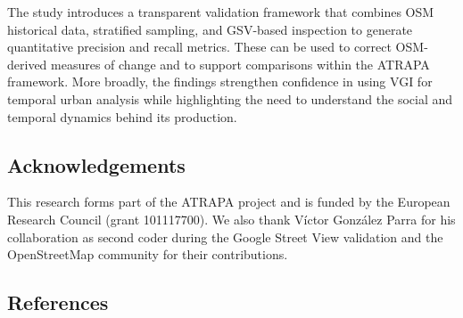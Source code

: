\documentclass[
  preprint, 3p, authoryear]{article}
\begin{document}
The study introduces a transparent validation framework that combines
OSM historical data, stratified sampling, and GSV-based inspection to
generate quantitative precision and recall metrics. These can be used to
correct OSM-derived measures of change and to support comparisons within
the ATRAPA framework. More broadly, the findings strengthen confidence
in using VGI for temporal urban analysis while highlighting the need to
understand the social and temporal dynamics behind its production.

\subsection*{Acknowledgements}\label{acknowledgements}

This research forms part of the ATRAPA project and is funded by the
European Research Council (grant 101117700). We also thank Víctor
González Parra for his collaboration as second coder during the Google
Street View validation and the OpenStreetMap community for their
contributions.

\subsection*{References}\label{references}
\end{document}
